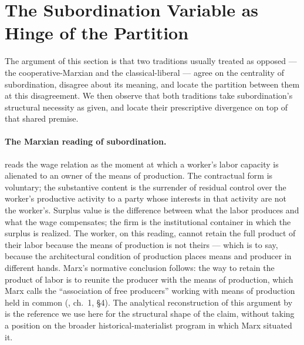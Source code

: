 \documentclass[11pt,a4paper]{article}
\theoremstyle{remark}
\begin{document}
\section{The Subordination Variable as Hinge of the Partition}
\label{sec:hinge}

The argument of this section is that two traditions usually
treated as opposed --- the cooperative-Marxian and the
classical-liberal --- agree on the centrality of subordination,
disagree about its meaning, and locate the partition between them
at this disagreement. We then observe that both traditions take
subordination's structural necessity as given, and locate their
prescriptive divergence on top of that shared premise.

\paragraph{The Marxian reading of subordination.}
\citet{marx1867capital} reads the wage relation as the moment at
which a worker's labor capacity is alienated to an owner of the
means of production. The contractual form is voluntary; the
substantive content is the surrender of residual control over the
worker's productive activity to a party whose interests in that
activity are not the worker's. Surplus value is the difference
between what the labor produces and what the wage compensates;
the firm is the institutional container in which the surplus is
realized. The worker, on this reading, cannot retain the full
product of their labor because the means of production is not
theirs --- which is to say, because the architectural condition
of production places means and producer in different hands.
Marx's normative conclusion follows: the way to retain the
product of labor is to reunite the producer with the means of
production, which Marx calls the ``association of free producers''
working with means of production held in common
(\citealt{marx1867capital}, ch.~1, §4). The analytical
reconstruction of this argument by \citet{cohen1978karl} is the
reference we use here for the structural shape of the claim,
without taking a position on the broader historical-materialist
program in which Marx situated it.
\end{document}

